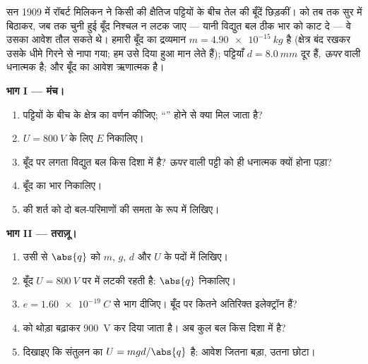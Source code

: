 \begin{problem}
\label{pb:g11:electric-gravitational-fields:1}
सन 1909 में रॉबर्ट मिलिकन ने किसी  की क्षैतिज पट्टियों के
बीच तेल की बूँदें छिड़कीं।  को तब तक सुर में बिठाकर, जब तक
चुनी हुई बूँद निश्चल न लटक जाए --- यानी विद्युत बल ठीक
भार को काट दे --- वे उसका आवेश तौल सकते थे। हमारी बूँद का द्रव्यमान
$m = \qty{4.90e-15}{kg}$ है (क्षेत्र बंद रखकर उसके धीमे गिरने से नापा गया; हम उसे
दिया हुआ मान लेते हैं); पट्टियाँ $d = \qty{8.0}{mm}$ दूर हैं, \emph{ऊपर} वाली धनात्मक
है; और बूँद का आवेश ऋणात्मक है।

\medskip
\noindent\textbf{भाग I --- मंच।}
\begin{enumerate}
  \item पट्टियों के बीच के क्षेत्र का वर्णन कीजिए; ``''
        होने से क्या मिल जाता है?
  \item $U = \qty{800}{V}$ के लिए $E$ निकालिए।
  \item बूँद पर लगता विद्युत बल किस दिशा में है? \emph{ऊपर} वाली
        पट्टी को ही धनात्मक क्यों होना पड़ा?
  \item बूँद का भार निकालिए।
  \item {} की शर्त को दो बल-परिमाणों की समता के रूप में लिखिए।
\end{enumerate}

\medskip
\noindent\textbf{भाग II --- तराज़ू।}
\begin{enumerate}[resume]
  \item उसी से $\abs{q}$ को $m$, $g$, $d$ और $U$ के पदों में
        लिखिए।
  \item बूँद $U = \qty{800}{V}$ पर  में लटकी रहती है: $\abs{q}$ निकालिए।
  \item $e = \qty{1.60e-19}{C}$ से भाग दीजिए। बूँद पर कितने अतिरिक्त इलेक्ट्रॉन हैं?
  \item {} को थोड़ा बढ़ाकर \qty{900}{V} कर दिया जाता है। अब कुल
        बल किस दिशा में है?
  \item दिखाइए कि संतुलन का  $U = mgd/\abs{q}$ है: आवेश जितना बड़ा,
         उतना छोटा।
\end{enumerate}


\end{problem}
